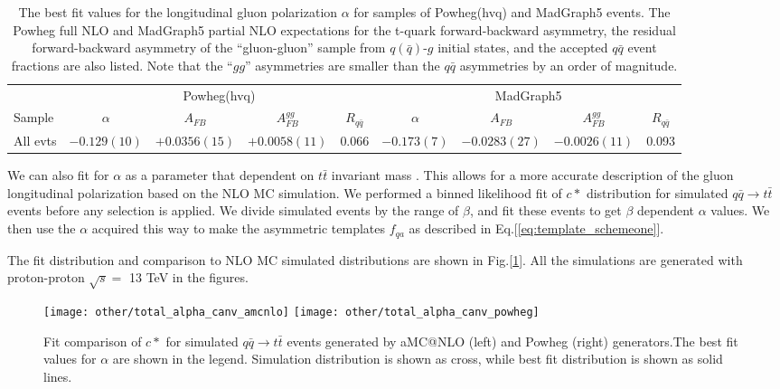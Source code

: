 \begin{table}[hbt]
	\begin{center}
		\caption{\small \label{tab:alpha_tune} The best fit values for the longitudinal gluon polarization $\alpha$ for samples of Powheg(hvq) and MadGraph5 events.  The Powheg full NLO and MadGraph5 partial NLO expectations for the t-quark forward-backward asymmetry, the residual forward-backward asymmetry of the ``gluon-gluon'' sample from $q(\bar q)$-$g$ initial states, and the accepted $q\bar q$ event fractions are also listed.  Note that the ``$gg$'' asymmetries are smaller than the $q\bar q$ asymmetries by an order of magnitude.}
		\vspace{3pt}
		\begin{tabular}{|l|cccc|cccc|}\hline
			& \multicolumn{4}{c}{Powheg(hvq)} &  \multicolumn{4}{|c|}{MadGraph5} \\ 
			Sample    & $\alpha$      &  $A_{FB}$      & $A_{FB}^{gg}$ &  $R_{q\bar q}$ &  $\alpha$    &  $A_{FB}$      & $A_{FB}^{gg}$ &  $R_{q\bar q}$ \\ \hline
			All evts  & $-0.129(10)$  & $+0.0356(15)$  & $+0.0058(11)$ & 0.066          & $-0.173(7)$  & $-0.0283(27)$  & $-0.0026(11)$ & 0.093          \\ 
			\hline
		\end{tabular}
	\end{center}
\end{table}

We can also fit for $\alpha$ as a parameter that dependent on $t\bar t$ invariant mass \cite{AFB-13Tev-AN}. This allows for a more accurate description of the gluon longitudinal polarization based on the NLO MC simulation. We performed a binned likelihood fit of $c*$ distribution for simulated $q\bar q \rightarrow t \bar t$ events before any selection is applied. We divide simulated events by the range of $\beta$, and fit these events to get $\beta$ dependent $\alpha$ values. We then use the $\alpha$ acquired this way to make the asymmetric templates $f_{qa}$ as described in Eq.[\ref{eq:template_schemeone}]. 

The fit distribution and comparison to NLO MC simulated distributions are shown in Fig.[\ref{fig:alpha_fit}]. All the simulations are generated with proton-proton $\sqrt{s}=$ 13 TeV in the figures. 

\begin{figure}[hbt]
	\begin{center}
		\texttt{[image: other/total\_alpha\_canv\_amcnlo]}
		\texttt{[image: other/total\_alpha\_canv\_powheg]}
		\caption{\small Fit comparison of $c*$ for simulated $q\bar q \rightarrow t \bar t$ events generated by aMC@NLO (left) and Powheg (right) generators.The best fit values for $\alpha$ are shown in the legend. Simulation distribution is shown as cross, while best fit distribution is shown as solid lines. }
		\label{fig:alpha_fit}
	\end{center}
\end{figure}


